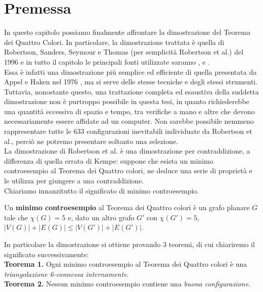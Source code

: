 \documentclass[a4paper,12pt,titlepage]{report}
\begin{document}
    \section{Premessa}
    In questo capitolo possiamo finalmente affrontare la dimostrazione del Teorema dei Quattro Colori. In particolare, la dimostrazione trattata è quella di Robertson, Sanders, Seymour e Thomas (per semplicità Robertson et al.) del 1996 e in tutto il capitolo le principali fonti utilizzate saranno {\bfseries \cite{Robertson}}, {\bfseries \cite{4CT}} e {\bfseries \cite{Thomas}}. 
    \\Essa è infatti una dimostrazione più semplice ed efficiente di quella presentata da Appel e Haken nel 1976 {\bfseries \cite{Appel}}, ma si serve delle stesse tecniche e degli stessi strumenti.
    \\Tuttavia, nonostante questo, una trattazione completa ed esaustiva della suddetta dimostrazione non è purtroppo possibile in questa tesi, in quanto richiederebbe una quantità eccessiva di spazio e tempo, tra verifiche a mano e altre che devono necessariamente essere affidate ad un computer. Non sarebbe possibile nemmeno rappresentare tutte le 633 configurazioni inevitabili individuate da Robertson et al., perciò ne potremo presentare soltanto una selezione.
    \\La dimostrazione di Robertson et al. è una dimostrazione per contraddizione, a differenza di quella errata di Kempe: suppone che esista un minimo controesempio al Teorema dei Quattro colori, ne deduce una serie di proprietà e le utilizza per giungere a una contraddizione.
    \\Chiariamo innanzitutto il significato di minimo controesempio.
    \begin{dfn}
    	Un {\bfseries minimo controesempio} al Teorema dei Quattro colori è un grafo planare $G$ tale che $\chi(G) = 5$ e, dato un altro grafo $G'$ con $\chi(G') = 5$, $\lvert V(G) \rvert + \lvert E(G) \rvert \leq \lvert V(G') \rvert + \lvert E(G') \rvert$.
    \end{dfn}
    \noindent In particolare la dimostrazione si ottiene provando 3 teoremi, di cui chiariremo il significato successivamente:
    \vspace{0.5cm}
    \\{\bfseries Teorema 1.} Ogni minimo controesempio al Teorema dei Quattro colori è una \emph{triangolazione 6-connessa internamente}.
    \\{\bfseries Teorema 2.} Nessun minimo controesempio contiene una \emph{buona configurazione}.
\end{document}
